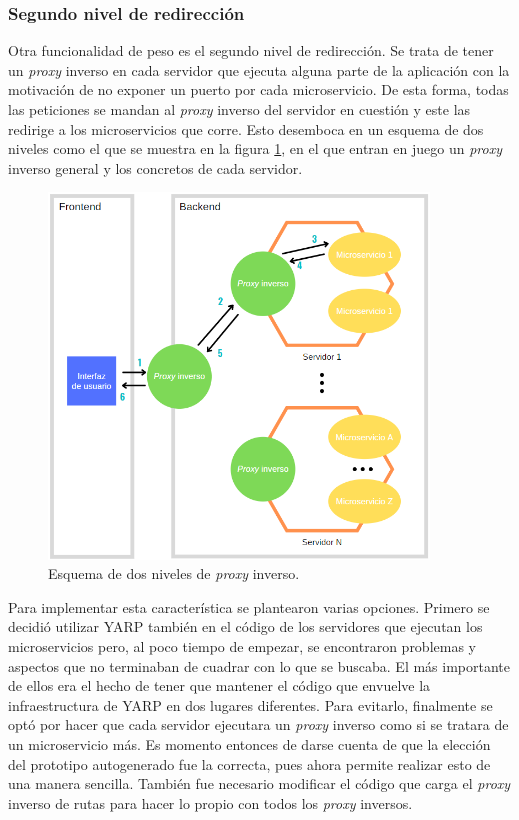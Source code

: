 \documentclass[11pt,spanish,listoffigures]{tfgetsinf}
\begin{document}
			\subsubsection{Segundo nivel de redirección}

Otra funcionalidad de peso es el segundo nivel de redirección. Se trata de tener un \emph{proxy} inverso en cada servidor que ejecuta alguna parte de la aplicación con la motivación de no exponer un puerto por cada microservicio. De esta forma, todas las peticiones se mandan al \emph{proxy} inverso del servidor en cuestión y este las redirige a los microservicios que corre. Esto desemboca en un esquema de dos niveles como el que se muestra en la figura \ref{esquemaProxyInversoDoble}, en el que entran en juego un \emph{proxy} inverso general y los concretos de cada servidor.

\begin{figure}[ht]
\centering
\includegraphics[width=0.9\textwidth]{imagenes/esquemaProxyInversoDoble}
\caption{Esquema de dos niveles de \emph{proxy} inverso.}
	\label{esquemaProxyInversoDoble}
\end{figure}

Para implementar esta característica se plantearon varias opciones. Primero se decidió utilizar YARP también en el código de los servidores que ejecutan los microservicios pero, al poco tiempo de empezar, se encontraron problemas y aspectos que no terminaban de cuadrar con lo que se buscaba. El más importante de ellos era el hecho de tener que mantener el código que envuelve la infraestructura de YARP en dos lugares diferentes. Para evitarlo, finalmente se optó por hacer que cada servidor ejecutara un \emph{proxy} inverso como si se tratara de un microservicio más. Es momento entonces de darse cuenta de que la elección del prototipo autogenerado fue la correcta, pues ahora permite realizar esto de una manera sencilla. También fue necesario modificar el código que carga el \emph{proxy} inverso de rutas para hacer lo propio con todos los \emph{proxy} inversos.
\end{document}
